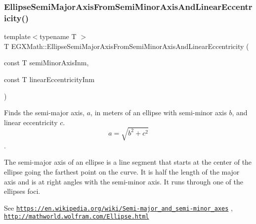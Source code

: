 \mbox{\label{group___e_g_x_math-_geometry-2_d-_ellipse-_semi_major_axis_gaed0cc0b8da6cffa6cb9e28e773bc6e16}} 
\subsubsection{\texorpdfstring{Ellipse\+Semi\+Major\+Axis\+From\+Semi\+Minor\+Axis\+And\+Linear\+Eccentricity()}{EllipseSemiMajorAxisFromSemiMinorAxisAndLinearEccentricity()}}
{\footnotesize\ttfamily template$<$typename T $>$ \\
T E\+G\+X\+Math\+::\+Ellipse\+Semi\+Major\+Axis\+From\+Semi\+Minor\+Axis\+And\+Linear\+Eccentricity (\begin{DoxyParamCaption}\item[{const T}]{semi\+Minor\+Axis\+Inm,  }\item[{const T}]{linear\+Eccentricity\+Inm }\end{DoxyParamCaption})}



Finds the semi-\/major axis, $a$, in meters of an ellipse with semi-\/minor axis $b$, and linear eccentricity $c$. \[ a=\sqrt{b^2+c^2} \]. 

The semi-\/major axis of an ellipse is a line segment that starts at the center of the ellipse going the farthest point on the curve. It is half the length of the major axis and is at right angles with the semi-\/minor axis. It runs through one of the ellipses foci.

See \href{https://en.wikipedia.org/wiki/Semi-major_and_semi-minor_axes}{\tt https\+://en.\+wikipedia.\+org/wiki/\+Semi-\/major\+\_\+and\+\_\+semi-\/minor\+\_\+axes} , \href{http://mathworld.wolfram.com/Ellipse.html}{\tt http\+://mathworld.\+wolfram.\+com/\+Ellipse.\+html}


